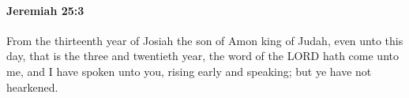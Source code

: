 
		\paragraph{Jeremiah 25:3} %
			\label{JEREMIAH-25-3}

			From the thirteenth year of Josiah the son of Amon king of Judah, even unto this day, that is the three and twentieth year, the word of the LORD hath come unto me, and I have spoken unto you, rising early and speaking; but ye have not hearkened.


